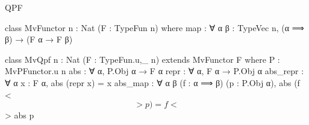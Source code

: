 \documentclass[t,12pt]{beamer}
\begin{document}
\begin{frame}[fragile]{QPF}

    \vfill

    \begin{leancode}
class MvFunctor {n : Nat} (F : TypeFun n) where
  map : ∀ {α β : TypeVec n}, 
            (α ⟹ β) → (F α → F β)

class MvQpf {n : Nat} (F : TypeFun.{u,_} n) 
                extends MvFunctor F where
  P : MvPFunctor.{u} n
  abs : ∀ {α}, P.Obj α → F α
  repr : ∀ {α}, F α → P.Obj α
  abs_repr : ∀ {α} x : F α, abs (repr x) = x
  abs_map : ∀ {α β} (f : α ⟹ β) (p : P.Obj α),
                abs (f <$$> p) = f <$$> abs p
\end{leancode}

    \vfill
\end{frame}






















     
    


\end{document}
